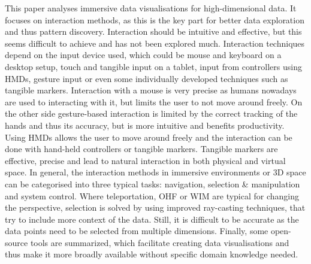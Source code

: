 This paper analyses immersive data visualisations for high-dimensional data. It focuses on interaction methods, as this is the key part for better data exploration and thus pattern discovery. Interaction should be intuitive and effective, but this seems difficult to achieve and has not been explored much. Interaction techniques depend on the input device used, which could be mouse and keyboard on a desktop setup, touch and tangible input on a tablet, input from controllers using \ac{HMD}s, gesture input or even some individually developed techniques such as tangible markers. Interaction with a mouse is very precise as humans nowadays are used to interacting with it, but limits the user to not move around freely. On the other side gesture-based interaction is limited by the correct tracking of the hands and thus its accuracy, but is more intuitive and benefits productivity. Using \ac{HMD}s allows the user to move around freely and the interaction can be done with hand-held controllers or tangible markers. Tangible markers are effective, precise and lead to natural interaction in both physical and virtual space. In general, the interaction methods in immersive environments or 3D space can be categorised into three typical tasks: navigation, selection \& manipulation and system control. Where teleportation, \ac{OHF} or \ac{WIM} are typical for changing the perspective, selection is solved by using improved ray-casting techniques, that try to include more context of the data. Still, it is difficult to be accurate as the data points need to be selected from multiple dimensions. Finally, some open-source tools are summarized, which facilitate creating data visualisations and thus make it more broadly available without specific domain knowledge needed.